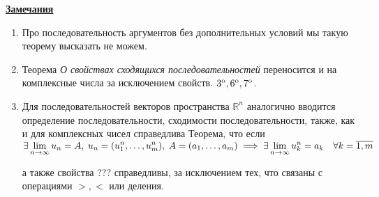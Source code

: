 \underline{\textbf{Замечания}}
\begin{enumerate}
    \item Про последовательность аргументов без дополнительных условий мы такую
    теорему высказать не можем.

    \item Теорема \textit{О свойствах сходящихся последовательностей} переносится
    и на комплексные числа за исключением свойств. $3^{\text{o}}, 6^{\text{o}}, 7^{\text{o}}$.

    \item Для последовательностей векторов пространства $\mathbb{R}^n$ аналогично
    вводится определение последовательности, сходимости последовательности,
    также, как и для комплексных чисел справедлива Теорема, что если
    $\exists \displaystyle\lim_{n \to \infty} u_n = A, \; u_n = (u_1^n, \dots, u_m^n), \;
    A = (a_1, \dots, a_m) \implies \exists \displaystyle\lim_{n \to \infty} u_k^n = a_k \quad 
    \forall k = \overline{1, m}$

    а также свойства ??? справедливы, за исключением тех, что связаны
    с операциями $>, <$ или деления.
\end{enumerate}

